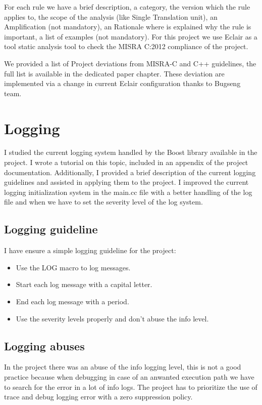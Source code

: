 \documentclass[a4paper, 12pt]{article}
\begin{document}
For each rule we have a brief description, a category, the version which the rule applies to, the scope of the analysis (like Single Translation unit), 
an Amplification (not mandatory), an Rationale where is explained why the rule is important, a list of examples (not mandatory).
For this project we use Eclair \cite{Eclair} as a tool static analysis tool to check the MISRA C:2012 compliance of the project.

We provided a list of Project deviations from MISRA-C and C++ guidelines, the full list is available in the dedicated paper chapter.
These deviation are implemented via a change in current Eclair configuration thanks to Bugseng team.

\section{Logging}

I studied the current logging system handled by the Boost library available in the project. 
I wrote a tutorial on this topic, included in an appendix of the project documentation. Additionally, I provided a brief description of the current logging guidelines and assisted in applying them to the project.
I improved the current logging initialization system in the main.cc file with a better handling of the log file and when we have to set the 
severity level of the log system.

\subsection{Logging guideline}

I have ensure a simple logging guideline for the project:

\begin{itemize}
    \item Use the LOG macro to log messages.
    \item Start each log message with a capital letter.
    \item End each log message with a period.
    \item Use the severity levels properly and don't abuse the info level.
\end{itemize}

\subsection{Logging abuses}
In the project there was an abuse of the info logging level, this is not a good practice because when debugging in case of an anwanted execution path we have to search for the error in a lot of info logs.
The project has to prioritize the use of trace and debug logging error with a zero suppression policy.
\end{document}
